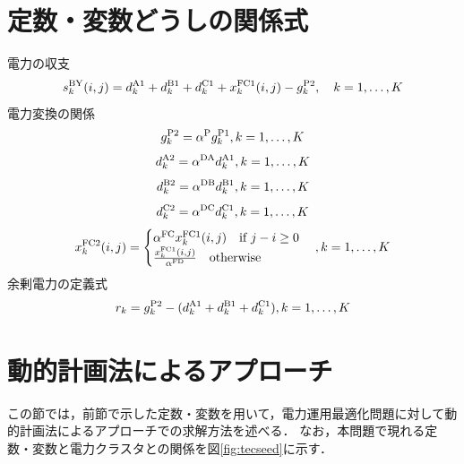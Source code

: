 \documentclass{jarticle}
\begin{document}
\section{定数・変数どうしの関係式}
電力の収支
\begin{equation}
 s_k^{\rm BY}(i,j)= 
 d_k^{\rm A1}+ d_k^{\rm B1} + d_k^{\rm C1}+  x_k^{\rm FC1}(i,j) - g_k^{\rm P2},  \quad k=1,\ldots,K\\
  \label{eq:pass_abst}
\end{equation}
電力変換の関係
\begin{equation}
 g^{\rm P2}_{k} = \alpha^{\rm P} g^{\rm P1}_{k} ,
 \hfill
 k=1,\ldots,K
 \label{eq:gP1gP2}
\end{equation}
%
\begin{equation}
 d^{\rm A2}_{k} = \alpha^{\rm DA} d^{\rm A1}_{k} ,
 \hfill
 k=1,\ldots,K
 \label{eq:dA1A2}
\end{equation}
%
\begin{equation}
 d^{\rm B2}_{k} = \alpha^{\rm DB} d^{\rm B1}_{k},
 \hfill
 k=1,\ldots,K
 \label{eq:dB1B2}
\end{equation}
%
\begin{equation}
 d^{\rm C2}_{k} = \alpha^{\rm DC} d^{\rm C1}_{k},
 \hfill
 k=1,\ldots,K
 \label{eq:dC1C2}
\end{equation}
%
\begin{equation}
 x^{\rm FC2}_{k}(i,j) =\begin{cases}
  \alpha^{\rm FC}x^{\rm FC1}_{k}(i,j)  \quad \text{if } j-i \ge 0 \\
  \frac{x^{\rm FC1}_{k}(i,j)}{\alpha^{\rm FD}} \quad \text{otherwise }
 \end{cases}
  \hfill
 ,k=1,\ldots,K
 \label{eq:xFC1FC2}
\end{equation}
%
余剰電力の定義式
\begin{equation}
 r_{k} = g^{\rm P2}_k - (d^{\rm A1}_{k}+d^{\rm B1}_{k}+d^{\rm C1}_{k}),
 \hfill
 k=1,\ldots,K
 \label{eq:A2B2C2}
\end{equation}
%



\section{動的計画法によるアプローチ}
この節では，前節で示した定数・変数を用いて，電力運用最適化問題に対して動的計画法によるアプローチでの求解方法を述べる．
なお，本問題で現れる定数・変数と電力クラスタとの関係を図\ref{fig:tecseed}に示す．
\end{document}
